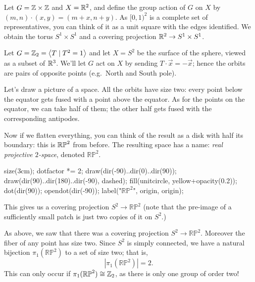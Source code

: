\begin{example}
	Let $G = \mathbb Z \times \mathbb Z$ and $X = \mathbb R^2$,
	and define the group action of $G$ on $X$ by $(m,n) \cdot (x,y)
	= (m+x, n+y)$.
	As $[0,1)^2$ is a complete set of representatives,
	you can think of it as a unit square with the edges identified.
	We obtain the torus $S^1 \times S^1$
	and a covering projection $\mathbb R^2 \to S^1 \times S^1$.
\end{example}

\begin{example}[$\mathbb {RP}^2$]
	Let $G = \mathbb Z_{2} = \left<T \mid T^2 = 1\right>$ and
	let $X = S^2$ be the surface of the sphere,
	viewed as a subset of $\mathbb R^3$.
	We'll let $G$ act on $X$ by sending $T \cdot \vec x = - \vec x$;
	hence the orbits are pairs of opposite points (e.g.\ North and South pole).

	Let's draw a picture of a space.
	All the orbits have size two:
	every point below the equator gets fused with a point above the equator.
	As for the points on the equator, we can take half of them; the other half
	gets fused with the corresponding antipodes.

	Now if we flatten everything,
	you can think of the result as a disk with half its boundary:
	this is $\mathbb{RP}^2$ from before.
	The resulting space has a name: \emph{real projective $2$-space},
	denoted $\mathbb{RP}^2$.
	\begin{center}
		\begin{asy}
			size(3cm);
			dotfactor *= 2;
			draw(dir(-90)..dir(0)..dir(90));
			draw(dir(90)..dir(180)..dir(-90), dashed);
			fill(unitcircle, yellow+opacity(0.2));
			dot(dir(90));
			opendot(dir(-90));
			label("$\mathbb{RP}^2$", origin, origin);
		\end{asy}
	\end{center}

	This gives us a covering projection $S^2 \to \mathbb{RP}^2$
	(note that the pre-image of a sufficiently small patch is just two copies
	of it on $S^2$.)
\end{example}
\begin{example}
	As above, we saw that there was a covering projection
	$S^2 \to \mathbb{RP}^2$.
	Moreover the fiber of any point has size two.
	Since $S^2$ is simply connected, we have a natural bijection
	$\pi_1(\mathbb{RP}^2)$ to a set of size two; that is,
	\[ \left\lvert \pi_1(\mathbb{RP}^2) \right\rvert = 2. \]
	This can only occur if $\pi_1(\mathbb{RP}^2) \cong \mathbb Z_{2}$,
	as there is only one group of order two!
\end{example}

